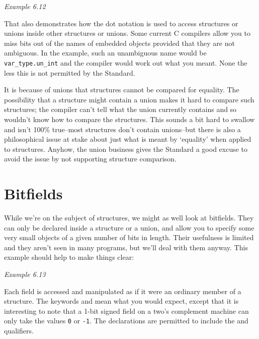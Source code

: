    \begin{center}\textit{Example 6.12}\end{center}


  That also demonstrates how the dot notation is used to access structures
   or unions inside other structures or unions. Some current C compilers allow
   you to miss bits out of the names of embedded objects provided that they are
   not ambiguous. In the example, such an unambiguous name would be
   \texttt{var\_type.un\_int} and the compiler would work out what you meant.
   None the less this is not permitted by the Standard.


  It is because of unions that structures cannot be compared for equality.
   The possibility that a structure might contain a union makes it hard to
   compare such structures; the compiler can't tell what the union currently
   contains and so wouldn't know how to compare the structures. This sounds
   a bit hard to swallow and isn't 100\% true--most structures don't contain
   unions--but there is also a philosophical issue at stake about just what
   is meant by `equality' when applied to structures. Anyhow, the union
   business gives the Standard a good excuse to avoid the issue by not
   supporting structure comparison.


 
        \section{Bitfields}\label{sec:bitfields}
        

  

  While we're on the subject of structures, we might as well look at
   bitfields. They can only be declared inside a structure or a union, and
   allow you to specify some very small objects of a given number of bits in
   length.  Their usefulness is limited and they aren't seen in many programs,
   but we'll deal with them anyway. This example should help to make things
   clear:


   \begin{center}\textit{Example 6.13}\end{center}


  Each field is accessed and manipulated as if it were an ordinary member of
   a structure. The keywords \signed{} and \unsigned{} mean
   what you would expect, except that it is interesting to note that a 1-bit
   signed field on a two's complement machine can only take the values
   \texttt{0} or \texttt{-1}. The declarations are permitted to include
   the \const{} and \volatile{} qualifiers.


